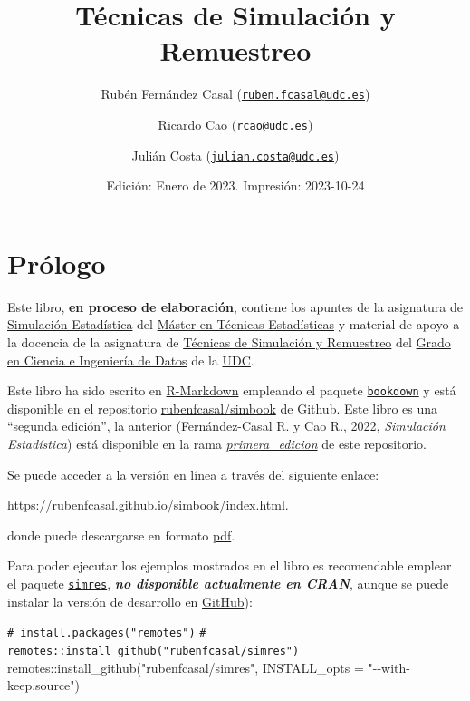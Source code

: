 \documentclass[
]{book}
\title{Técnicas de Simulación y Remuestreo}
\author{Rubén Fernández Casal (\href{mailto:ruben.fcasal@udc.es}{\nolinkurl{ruben.fcasal@udc.es}}) \and Ricardo Cao (\href{mailto:rcao@udc.es}{\nolinkurl{rcao@udc.es}}) \and Julián Costa (\href{mailto:julian.costa@udc.es}{\nolinkurl{julian.costa@udc.es}})}
\date{Edición: Enero de 2023. Impresión: 2023-10-24}
\newenvironment{Shaded}{\begin{snugshade}}{\end{snugshade}}
\newcommand{\AttributeTok}[1]{\textcolor[rgb]{0.77,0.63,0.00}{#1}}
\newcommand{\CommentTok}[1]{\textcolor[rgb]{0.56,0.35,0.01}{\textit{#1}}}
\newcommand{\FunctionTok}[1]{\textcolor[rgb]{0.00,0.00,0.00}{#1}}
\newcommand{\NormalTok}[1]{#1}
\newcommand{\SpecialCharTok}[1]{\textcolor[rgb]{0.00,0.00,0.00}{#1}}
\newcommand{\StringTok}[1]{\textcolor[rgb]{0.31,0.60,0.02}{#1}}
\theoremstyle{break}
\theoremstyle{nonumberplain}
\renewcommand{\CommentTok}[1]{\textcolor[rgb]{0.41,0.41,0.41}{\texttt{#1}}}
\begin{document}
\maketitle

{
\setcounter{tocdepth}{1}
\tableofcontents
}
\hypertarget{pruxf3logo}{%
\chapter*{Prólogo}\label{pruxf3logo}}

Este libro, \textbf{en proceso de elaboración}, contiene los apuntes de la asignatura de \href{http://eamo.usc.es/pub/mte/index.php/es/?option=com_content\&view=article\&id=2201\&idm=13\&a\%C3\%B1o=2019}{Simulación Estadística} del \href{http://eio.usc.es/pub/mte}{Máster en Técnicas Estadísticas} y material de apoyo a la docencia de la asignatura de \href{https://guiadocente.udc.es/guia_docent/index.php?centre=614\&ensenyament=614G02\&assignatura=614G02036\&idioma=cast}{Técnicas de Simulación y Remuestreo} del \href{https://estudos.udc.es/es/study/start/614G02V01}{Grado en Ciencia e Ingeniería de Datos} de la \href{https://www.udc.es}{UDC}.

Este libro ha sido escrito en \href{http://rmarkdown.rstudio.com}{R-Markdown} empleando el paquete \href{https://bookdown.org/yihui/bookdown/}{\texttt{bookdown}} y está disponible en el repositorio \href{https://github.com/rubenfcasal/simbook}{rubenfcasal/simbook} de Github.
Este libro es una ``segunda edición'', la anterior (Fernández-Casal R. y Cao R., 2022, \emph{Simulación Estadística}) está disponible en la rama \emph{\href{https://github.com/rubenfcasal/simbook/tree/primera_edicion}{primera\_edicion}} de este repositorio.

Se puede acceder a la versión en línea a través del siguiente enlace:

\url{https://rubenfcasal.github.io/simbook/index.html}.

donde puede descargarse en formato \href{https://rubenfcasal.github.io/simbook/Simulacion.pdf}{pdf}.

Para poder ejecutar los ejemplos mostrados en el libro es recomendable emplear el paquete \href{https://rubenfcasal.github.io/simres}{\texttt{simres}}, \textbf{\emph{no disponible actualmente en CRAN}}, aunque se puede instalar la versión de desarrollo en \href{https://github.com/rubenfcasal/simres}{GitHub}):

\begin{Shaded}
\begin{Highlighting}[]
\CommentTok{\# install.packages("remotes")}
\CommentTok{\# remotes::install\_github("rubenfcasal/simres")}
\NormalTok{remotes}\SpecialCharTok{::}\FunctionTok{install\_github}\NormalTok{(}\StringTok{"rubenfcasal/simres"}\NormalTok{, }\AttributeTok{INSTALL\_opts =} \StringTok{"{-}{-}with{-}keep.source"}\NormalTok{)}
\end{Highlighting}
\end{Shaded}
\end{document}
